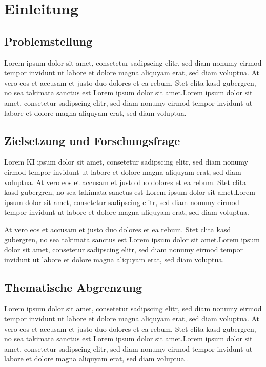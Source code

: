 \chapter{Einleitung}\label{chap:einleitung}

\section{Problemstellung}
  \label{subchap:problemstellung}

    Lorem ipsum dolor sit amet, consetetur sadipscing elitr, sed diam nonumy eirmod tempor invidunt ut labore et dolore magna aliquyam erat, sed diam voluptua.
    At vero eos et accusam et justo duo dolores et ea rebum. Stet clita kasd gubergren, no sea takimata sanctus est Lorem ipsum dolor sit amet.Lorem ipsum dolor sit amet, consetetur sadipscing elitr, sed diam nonumy eirmod tempor invidunt ut labore et dolore magna aliquyam erat, sed diam voluptua.
        
  \section{Zielsetzung und Forschungsfrage}
  \label{subchap:zielsetzung_forschungsfrage}

    Lorem \ac{KI} ipsum dolor sit amet, consetetur sadipscing elitr, sed diam nonumy eirmod tempor invidunt ut labore et dolore magna aliquyam erat, sed diam voluptua.
    At vero eos et accusam et justo duo dolores et ea rebum. Stet clita kasd gubergren, no sea takimata sanctus est Lorem ipsum dolor sit amet.Lorem ipsum dolor sit amet, consetetur sadipscing elitr, sed diam nonumy eirmod tempor invidunt ut labore et dolore magna aliquyam erat, sed diam voluptua.

    At vero eos et accusam et justo duo dolores et ea rebum. Stet clita kasd gubergren, no sea takimata sanctus est Lorem ipsum dolor sit amet.Lorem ipsum dolor sit amet, consetetur sadipscing elitr, sed diam nonumy eirmod tempor invidunt ut labore et dolore magna aliquyam erat, sed diam voluptua.

  \section{Thematische Abgrenzung}

    Lorem ipsum dolor sit amet, consetetur sadipscing elitr, sed diam nonumy eirmod tempor invidunt ut labore et dolore magna aliquyam erat, sed diam voluptua. At \textcite{howtocite} vero eos et accusam et justo duo dolores et ea rebum. Stet clita kasd gubergren, no sea takimata sanctus est Lorem ipsum dolor sit amet.Lorem ipsum dolor sit amet, consetetur sadipscing elitr, sed diam nonumy eirmod tempor invidunt ut labore et dolore magna aliquyam erat, sed diam voluptua .

